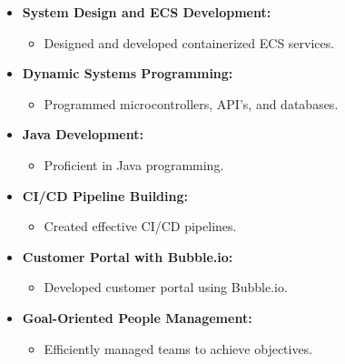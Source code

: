 \documentclass[10pt,a4paper]{altacv}
\begin{document}
  
\begin{itemize}
\item \textbf{System Design and ECS Development:}
  \begin{itemize}
    \item Designed and developed containerized ECS services.
  \end{itemize}
\item \textbf{Dynamic Systems Programming:}
  \begin{itemize}
    \item Programmed microcontrollers, API's, and databases.
  \end{itemize}
\item \textbf{Java Development:}
  \begin{itemize}
    \item Proficient in Java programming.
  \end{itemize}
\item \textbf{CI/CD Pipeline Building:}
  \begin{itemize}
    \item Created effective CI/CD pipelines.
  \end{itemize}
\item \textbf{Customer Portal with Bubble.io:}
  \begin{itemize}
    \item Developed customer portal using Bubble.io.
  \end{itemize}
\item \textbf{Goal-Oriented People Management:}
  \begin{itemize}
    \item Efficiently managed teams to achieve objectives.
  \end{itemize}
\end{itemize}
\end{document}
